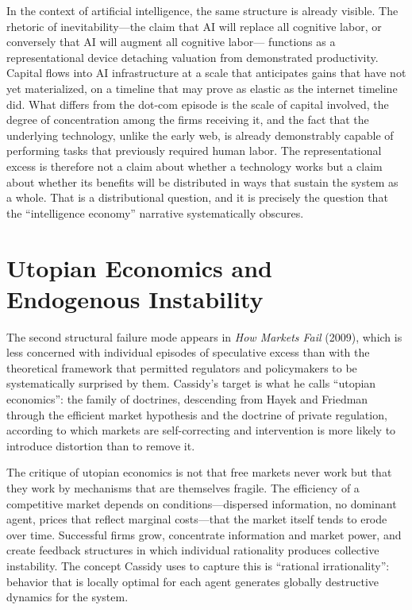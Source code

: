 \documentclass[11pt, a4paper]{article}
\theoremstyle{plain}
\theoremstyle{definition}
\begin{document}
In the context of artificial intelligence, the same structure is already
visible. The rhetoric of inevitability---the claim that AI will replace all
cognitive labor, or conversely that AI will augment all cognitive labor---
functions as a representational device detaching valuation from demonstrated
productivity. Capital flows into AI infrastructure at a scale that anticipates
gains that have not yet materialized, on a timeline that may prove as elastic
as the internet timeline did. What differs from the dot-com episode is the
scale of capital involved, the degree of concentration among the firms
receiving it, and the fact that the underlying technology, unlike the early
web, is already demonstrably capable of performing tasks that previously
required human labor. The representational excess is therefore not a claim
about whether a technology works but a claim about whether its benefits will
be distributed in ways that sustain the system as a whole. That is a
distributional question, and it is precisely the question that the
``intelligence economy'' narrative systematically obscures.

\section{Utopian Economics and Endogenous Instability}

The second structural failure mode appears in \emph{How Markets Fail} (2009),
which is less concerned with individual episodes of speculative excess than
with the theoretical framework that permitted regulators and policymakers to
be systematically surprised by them. Cassidy's target is what he calls
``utopian economics'': the family of doctrines, descending from Hayek and
Friedman through the efficient market hypothesis and the doctrine of private
regulation, according to which markets are self-correcting and intervention
is more likely to introduce distortion than to remove it.

The critique of utopian economics is not that free markets never work but
that they work by mechanisms that are themselves fragile. The efficiency of
a competitive market depends on conditions---dispersed information, no
dominant agent, prices that reflect marginal costs---that the market itself
tends to erode over time. Successful firms grow, concentrate information and
market power, and create feedback structures in which individual rationality
produces collective instability. The concept Cassidy uses to capture this is
``rational irrationality'': behavior that is locally optimal for each agent
generates globally destructive dynamics for the system.
\end{document}
